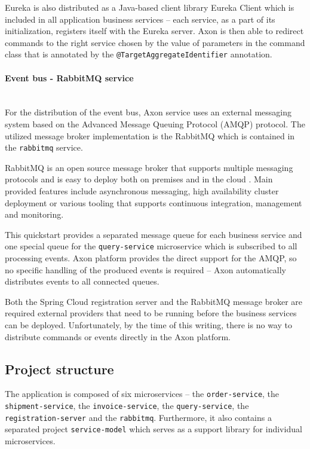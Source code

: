 \documentclass[oneside,
  digital, %
  table,   %
  lof,     %
  lot,     %
]{fithesis3}
\newcommand{\newlinepar}[1]{\paragraph{#1}\needspace{3\baselineskip}\mbox{}\\}
\begin{document}
Eureka is also distributed as a Java-based client library Eureka Client which is included in all application business services -- each service, as a part of its initialization, registers itself with the Eureka server. Axon is then able to redirect commands to the right service chosen by the value of parameters in the command class that is annotated by the \texttt{@TargetAggregateIdentifier} annotation.

\newlinepar{Event bus - RabbitMQ service}

For the distribution of the event bus, Axon service uses an external messaging system based on the Advanced Message Queuing Protocol (AMQP) protocol. The utilized message broker implementation is the RabbitMQ \cite{rabbitmq} which is contained in the \texttt{rabbitmq} service. 

RabbitMQ is an open source message broker that supports multiple messaging protocols and is easy to deploy both on premises and in the cloud \cite{rabbitmq}. Main provided features include asynchronous messaging, high availability cluster deployment or various tooling that supports continuous integration, management and monitoring.

This quickstart provides a separated message queue for each business service and one special queue for the \texttt{query-service} microservice which is subscribed to all processing events. Axon platform provides the direct support for the AMQP, so no specific handling of the produced events is required -- Axon automatically distributes events to all connected queues.

Both the Spring Cloud registration server and the RabbitMQ message broker are required external providers that need to be running before the business services can be deployed. Unfortunately, by the time of this writing, there is no way to distribute commands or events directly in the Axon platform.

\subsection{Project structure}

The application is composed of six microservices -- the  \texttt{order-service}, the \texttt{shipment-service}, the \texttt{invoice-service}, the \texttt{query-service}, the \texttt{registration-server} and the \texttt{rabbitmq}. Furthermore, it also contains a separated project \texttt{service-model} which serves as a support library for individual microservices.
\end{document}
